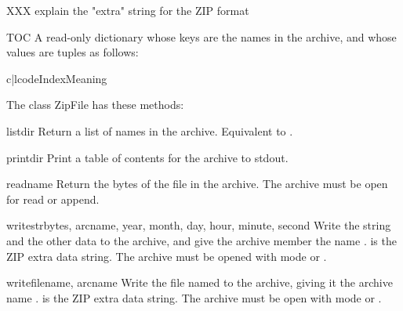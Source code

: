 XXX explain the "extra" string for the ZIP format

\begin{memberdesc}{TOC}
  A read-only dictionary whose keys are the names in the archive, and
  whose values are tuples as follows:

\begin{tableii}{c|l}{code}{Index}{Meaning}
\end{tableii}
\end{memberdesc}

The class ZipFile has these methods: 

\begin{methoddesc}{listdir}{}
  Return a list of names in the archive.  Equivalent to
  .
\end{methoddesc}

\begin{methoddesc}{printdir}{}
  Print a table of contents for the archive to stdout. 
\end{methoddesc}

\begin{methoddesc}{read}{name}
  Return the bytes of the file in the archive.  The archive must be
  open for read or append.
\end{methoddesc}

\begin{methoddesc}{writestr}{bytes, arcname, year, month, day, hour,
                             minute, second}
  Write the string  and the other data to the archive, and
  give the archive member the name .   is the
  ZIP extra data string.  The archive must be opened with mode
   or .
\end{methoddesc}

\begin{methoddesc}{write}{filename, arcname}
  Write the file named  to the archive, giving it the
  archive name .   is the ZIP extra data
  string.  The archive must be open with mode  or
  .
\end{methoddesc}

